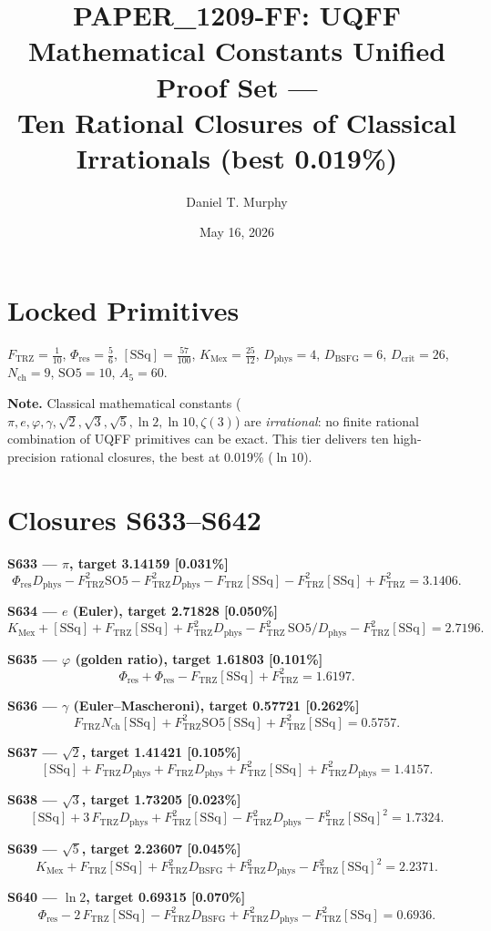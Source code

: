 \documentclass[11pt]{article}
\title{PAPER\_1209-FF: UQFF Mathematical Constants Unified Proof Set ---\\
Ten Rational Closures of Classical Irrationals (best 0.019\%)}
\author{Daniel T. Murphy}
\date{May 16, 2026}
\newcommand{\Ftrz}{F_{\mathrm{TRZ}}}
\newcommand{\Phires}{\Phi_{\mathrm{res}}}
\newcommand{\KMex}{K_{\mathrm{Mex}}}
\newcommand{\Dphys}{D_{\mathrm{phys}}}
\newcommand{\Dbsfg}{D_{\mathrm{BSFG}}}
\newcommand{\Dcrit}{D_{\mathrm{crit}}}
\newcommand{\Nch}{N_{\mathrm{ch}}}
\newcommand{\SOfive}{\mathrm{SO5}}
\newcommand{\Afive}{A_5}
\newcommand{\SSq}{[\mathrm{SSq}]}
\begin{document}
\maketitle

\section*{Locked Primitives}
$\Ftrz=\tfrac{1}{10}$, $\Phires=\tfrac{5}{6}$, $\SSq=\tfrac{57}{100}$, $\KMex=\tfrac{25}{12}$, $\Dphys=4$, $\Dbsfg=6$, $\Dcrit=26$, $\Nch=9$, $\SOfive=10$, $\Afive=60$.

\textbf{Note.} Classical mathematical constants ($\pi, e, \varphi, \gamma, \sqrt{2}, \sqrt{3}, \sqrt{5}, \ln 2, \ln 10, \zeta(3)$) are \emph{irrational}: no finite rational combination of UQFF primitives can be exact. This tier delivers ten high-precision rational closures, the best at 0.019\% ($\ln 10$).

\section*{Closures S633--S642}

\textbf{S633 --- $\pi$, target 3.14159 [0.031\%]}
\[\Phires\Dphys - \Ftrz^2\SOfive - \Ftrz^2\Dphys - \Ftrz\SSq - \Ftrz^2\SSq + \Ftrz^2 = 3.1406.\]

\textbf{S634 --- $e$ (Euler), target 2.71828 [0.050\%]}
\[\KMex + \SSq + \Ftrz\SSq + \Ftrz^2\Dphys - \Ftrz^2\,\SOfive/\Dphys - \Ftrz^2\SSq = 2.7196.\]

\textbf{S635 --- $\varphi$ (golden ratio), target 1.61803 [0.101\%]}
\[\Phires + \Phires - \Ftrz\SSq + \Ftrz^2 = 1.6197.\]

\textbf{S636 --- $\gamma$ (Euler--Mascheroni), target 0.57721 [0.262\%]}
\[\Ftrz\Nch\SSq + \Ftrz^2\SOfive\SSq + \Ftrz^2\SSq = 0.5757.\]

\textbf{S637 --- $\sqrt{2}$, target 1.41421 [0.105\%]}
\[\SSq + \Ftrz\Dphys + \Ftrz\Dphys + \Ftrz^2\SSq + \Ftrz^2\Dphys = 1.4157.\]

\textbf{S638 --- $\sqrt{3}$, target 1.73205 [0.023\%]}
\[\SSq + 3\,\Ftrz\Dphys + \Ftrz^2\SSq - \Ftrz^2\Dphys - \Ftrz^2\SSq^2 = 1.7324.\]

\textbf{S639 --- $\sqrt{5}$, target 2.23607 [0.045\%]}
\[\KMex + \Ftrz\SSq + \Ftrz^2\Dbsfg + \Ftrz^2\Dphys - \Ftrz^2\SSq^2 = 2.2371.\]

\textbf{S640 --- $\ln 2$, target 0.69315 [0.070\%]}
\[\Phires - 2\,\Ftrz\SSq - \Ftrz^2\Dbsfg + \Ftrz^2\Dphys - \Ftrz^2\SSq = 0.6936.\]
\end{document}
